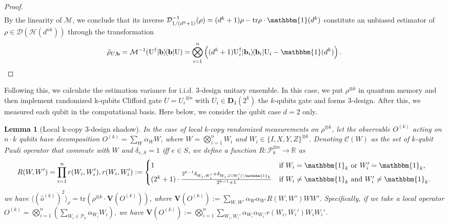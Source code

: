 \documentclass[aps,%
twocolumn,%
floatfix,%
pra,%
amsfonts,%
groupedaddress,%
superscriptaddress]{revtex4-2}%
\newtheorem{lemma}{Lemma}
\newcommand{\bra}[1]{\langle #1\rvert}
\newcommand{\ket}[1]{\lvert #1\rangle}
\newcommand{\1}{\mathbbm{1}}
\begin{document}
\begin{proof}
\begin{align}
\end{align}
By the linearity of $\mathcal{M}$, we  conclude that its inverse $\mathcal{D}_{{1}/{(d^k +1)}}^{-1}(\rho) = (d^k + 1)\rho - \text{tr}\rho \cdot \1(d^k) $ constitute an unbiased estimator of $\rho \in \mathcal{D}(\mathcal{H}(d^{nk}))$ through the transformation
\begin{align}
     \hat \rho_{U,\mathbf b} =\mathcal{M}^{-1}(\text{U}^\dagger \ket{\mathbf b}\!\bra{\mathbf b} \text{U})=\bigotimes_{i =1}^n\left((d^k +1)\text{U}_i^{\dagger} \ket{\mathbf{b}_i}\!\bra{\mathbf{b}_i} \text{U}_i - \1(d^k)\right).
\end{align}
\end{proof}
Following this, we calculate the estimation variance for i.i.d. 3-design unitary ensemble.
In this case, we put $\rho^{\otimes k}$ in quantum memory and then implement randomized k-qubits Clifford gate $U = {U_i}^{\otimes n}$ with $U_i \in \mathbf{D}_{3}(2^k)$ the $k$-qubits gate and forms $3$-design. After this, we measured each qubit in the computational basis. 
Here below, we consider the qubit case $d = 2$ only.
\begin{lemma}[Local k-copy 3-design shadow]\label{lemma:LC_shadow_kcopy}
    In the case of local k-copy randomized measurements on $\rho^{\otimes k}$, let the observable $O^{(k)}$ acting on $n\cdot k$ qubits have decomposition $O^{(k)} = \sum_{W} \alpha_{W} W$, where $W = \bigotimes_{i=1}^n W_i$ and $W_i \in \{I,X,Y,Z\}^{\otimes k}$. Denoting $\mathcal{C}(W)$ as the set of $k$-qubit Pauli operator that commute with $W$ and $\delta_{e,S} = 1$ iff $e\in S$, we define a function $R:\mathcal{P}_k^{\otimes n} \to \mathbb{R}$ as
    \begin{align}\label{eq:R_expression}
        R(W,W') = \prod_{i = 1}^n r(W_i,W'_i), r(W_i,W'_i) := \begin{cases}
            1 &\text{if~}W_i = \1_k \text{~or~}W'_i = \1_k ,\\
            (2^k+1) \cdot \frac{2^{k-1}\delta_{W_i,W'_i} +\delta_{W_i, \mathcal{C}(W'_i)\backslash \1_k } }{2^{k-1}+1} &\text{if~}W_i \neq \1_k \text{~and~} W'_i \neq \1_k .
        \end{cases}
    \end{align}
    we have $\langle (\hat{o}^{(k)})^2 \rangle_{\rho} =\text{tr} \left(\rho^{\otimes k} \cdot \mathbf{V}(O^{(k)}) \right)$, where $\mathbf{V}(O^{(k)}) := \sum_{W,W'}\alpha_W \alpha_{W'} R(W,W')W W'$. Specifically, if we take a local operator $O^{(k)} = \bigotimes_{i = 1}^n \left(\sum_{W_i \in \mathcal{P}_k}\alpha_{W_i} W_i\right)$, we have $\mathbf{V}(O^{(k)}) :=\bigotimes_{i = 1}^n  \sum_{W_i,W_i'}\alpha_{W_i} \alpha_{W_i'} r(W_i,W_i')W_i W_i'$.
\end{lemma}
\end{document}
